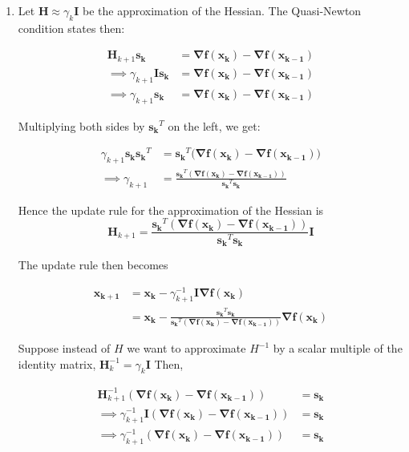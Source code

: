 \documentclass[12pt,a4paper]{article}
\theoremstyle{remark}
\begin{document}
\begin{enumerate}
    \item Let $\mathbf{H} \approx \gamma_k \mathbf{I}$ be the approximation of the Hessian. The Quasi-Newton condition states then:
    
    \begin{align*}
        \mathbf{H}_{k + 1} \mathbf{s_k} &= \mathbf{\nabla f(\mathbf{x_k}) - \nabla f(\mathbf{x_{k - 1}})} \\
        \implies \gamma_{k + 1} \mathbf{I} \mathbf{s_k} &= \mathbf{\nabla f(\mathbf{x_k}) - \nabla f(\mathbf{x_{k - 1}})} \\
        \implies \gamma_{k + 1} \mathbf{s_k} &= \mathbf{\nabla f(\mathbf{x_k}) - \nabla f(\mathbf{x_{k - 1}})}
    \end{align*}

    Multiplying both sides by $\mathbf{s_k}^T$ on the left, we get:

    \begin{align*}
        \gamma_{k + 1} \mathbf{s_k} \mathbf{s_k}^T &= \mathbf{s_k}^T (\mathbf{\nabla f(\mathbf{x_k}) - \nabla f(\mathbf{x_{k - 1}}))} \\
        \implies \gamma_{k + 1} &= \frac{\mathbf{s_k}^T (\mathbf{\nabla f(\mathbf{x_k}) - \nabla f(\mathbf{x_{k - 1}})})}{\mathbf{s_k}^T \mathbf{s_k}}
    \end{align*}

    Hence the update rule for the approximation of the Hessian is $$\mathbf{H}_{k + 1} = \frac{\mathbf{s_k}^T (\mathbf{\nabla f(\mathbf{x_k}) - \nabla f(\mathbf{x_{k - 1}})})}{\mathbf{s_k}^T \mathbf{s_k}} \mathbf{I}$$

    The update rule then becomes

    \begin{align*}
        \mathbf{x_{k + 1}} &= \mathbf{x_k} - \gamma_{k + 1}^{-1} \mathbf{I} \mathbf{\nabla f(\mathbf{x_k})} \\
        &= \mathbf{x_k} - \frac{\mathbf{s_k}^T \mathbf{s_k}}{\mathbf{s_k}^T (\mathbf{\nabla f(\mathbf{x_k}) - \nabla f(\mathbf{x_{k - 1}})})} \mathbf{\nabla f(\mathbf{x_k})}
    \end{align*}

    Suppose instead of $H$ we want to approximate $H^{-1}$ by a scalar multiple of the identity matrix, $\mathbf{H}^{-1}_k = \gamma_k \mathbf{I}$ Then,

    \begin{align*}
        \mathbf{H}_{k + 1}^{-1} (\mathbf{\nabla f(\mathbf{x}_k) - \nabla f(\mathbf{x}_{k - 1})}) &= \mathbf{s_k} \\
        \implies \gamma_{k + 1}^{-1} \mathbf{I} (\mathbf{\nabla f(\mathbf{x}_k) - \nabla f(\mathbf{x}_{k - 1})}) &= \mathbf{s_k} \\
        \implies \gamma_{k + 1}^{-1} (\mathbf{\nabla f(\mathbf{x}_k) - \nabla f(\mathbf{x}_{k - 1})}) &= \mathbf{s_k}
    \end{align*}


\end{enumerate}
\end{document}
